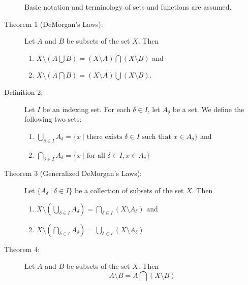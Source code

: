 \documentclass{article}
\begin{document}
\begin{description}

  \item[] Basic notation and terminology of sets and functions are assumed.

  \item[Theorem 1 (DeMorgan's Laws):] Let $A$ and $B$ be subsets of the set $X$. Then
    \begin{enumerate}[\hspace{1cm}1.]
      \item $X \setminus (A \bigcup B) = (X \setminus A) \bigcap (X \setminus B)$ and
      \item $X \setminus (A \bigcap B) = (X \setminus A) \bigcup (X \setminus B)$.
    \end{enumerate}

  \item[Definition 2:] Let $I$ be an indexing set. For each $\delta \in I$, let $A_{\delta}$ be a set. We define the following two sets:
    \begin{enumerate}[\hspace{1cm}1.]
      \item $\displaystyle{ \bigcup_{\delta \in I} A_{\delta} } = \{ x \ \vert \text{ there exists } \delta \in I \text{ such that } x \in A_{\delta} \}$ and
      \item $\displaystyle{ \bigcap_{\delta \in I} A_{\delta} } = \{ x \ \vert \text{ for all } \delta \in I, x \in A_{\delta} \}$
    \end{enumerate}

  \item[Theorem 3 (Generalized DeMorgan's Laws):] Let $\{ A_{\delta} \ \vert \ \delta \in I\}$ be a collection of subsets of the set $X$. Then
    \begin{enumerate}[\hspace{1cm}1.]
      \item $\displaystyle{ X \setminus (\bigcup_{\delta \in I} A_{\delta}) = \bigcap_{\delta \in I}(X \setminus A_{\delta}) }$ and
      \item $\displaystyle{ X \setminus (\bigcap_{\delta \in I} A_{\delta}) = \bigcup_{\delta \in I}(X \setminus A_{\delta}) }$
    \end{enumerate}

  \item[Theorem 4:] Let $A$ and $B$ be subsets of the set $X$. Then
    \begin{equation*}
    A \setminus B = A \bigcap (X \setminus B)
    \end{equation*}


\end{description}
\end{document}
